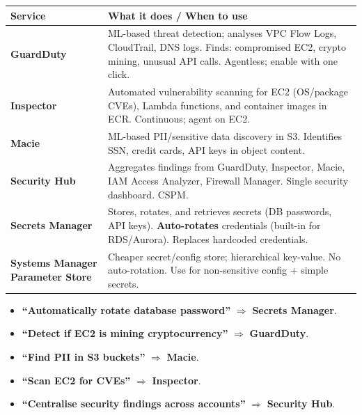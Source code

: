 \begin{comparebox}[title={Security service decision table}]
\begin{tabular}{@{}p{3.5cm}p{8cm}@{}}
\toprule
\textbf{Service} & \textbf{What it does / When to use} \\
\midrule
\textbf{GuardDuty}      & ML-based threat detection; analyses VPC Flow Logs, CloudTrail,
                           DNS logs. Finds: compromised EC2, crypto mining, unusual API calls.
                           Agentless; enable with one click. \\[4pt]
\textbf{Inspector}      & Automated vulnerability scanning for EC2 (OS/package CVEs), Lambda
                           functions, and container images in ECR. Continuous; agent on EC2. \\[4pt]
\textbf{Macie}          & ML-based PII/sensitive data discovery in S3.
                           Identifies SSN, credit cards, API keys in object content. \\[4pt]
\textbf{Security Hub}   & Aggregates findings from GuardDuty, Inspector, Macie, IAM Access
                           Analyzer, Firewall Manager. Single security dashboard. CSPM. \\[4pt]
\textbf{Secrets Manager} & Stores, rotates, and retrieves secrets (DB passwords, API keys).
                           \textbf{Auto-rotates} credentials (built-in for RDS/Aurora).
                           Replaces hardcoded credentials. \\[4pt]
\textbf{Systems Manager Parameter Store} & Cheaper secret/config store; hierarchical key-value.
                           No auto-rotation. Use for non-sensitive config + simple secrets. \\
\bottomrule
\end{tabular}
\end{comparebox}

\begin{examtip}
\begin{itemize}
  \item \textbf{``Automatically rotate database password''} $\Rightarrow$ \textbf{Secrets Manager}.
  \item \textbf{``Detect if EC2 is mining cryptocurrency''} $\Rightarrow$ \textbf{GuardDuty}.
  \item \textbf{``Find PII in S3 buckets''} $\Rightarrow$ \textbf{Macie}.
  \item \textbf{``Scan EC2 for CVEs''} $\Rightarrow$ \textbf{Inspector}.
  \item \textbf{``Centralise security findings across accounts''} $\Rightarrow$ \textbf{Security Hub}.
\end{itemize}
\end{examtip}

